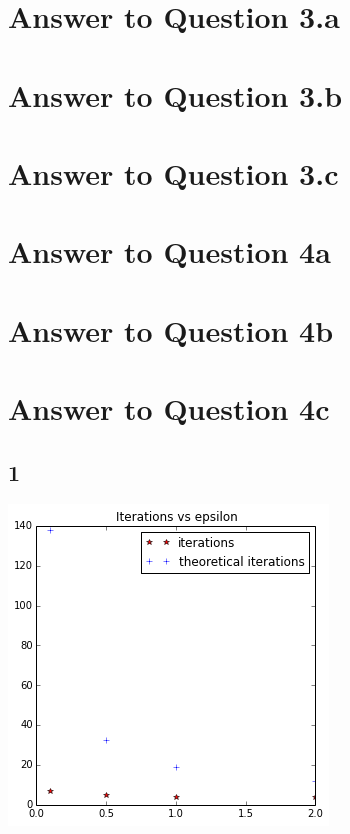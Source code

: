 \documentclass[11pt]{article}
\begin{document}
{\pagebreak[4]
\section*{Answer to Question 3.a}

\pagebreak[4]
\section*{Answer to Question 3.b}

\pagebreak[4]
\section*{Answer to Question 3.c}


\pagebreak[4]
\section*{Answer to Question 4a}


\pagebreak[4]
\section*{Answer to Question 4b}

\pagebreak[4]
\section*{Answer to Question 4c}


\subsection*{1}
\includegraphics[scale=0.8]{q4c1}\\

\vspace{2cm}

}
\end{document}
